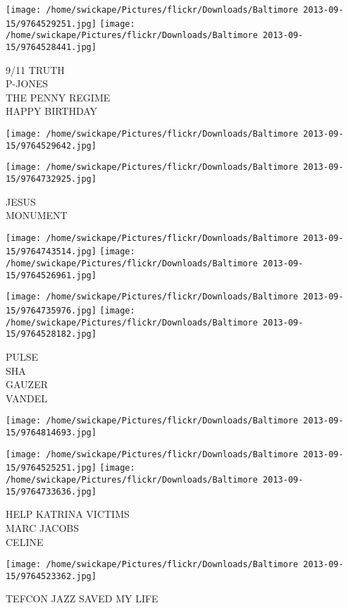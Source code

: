 \documentclass[10pt,letterpaper]{article}
\begin{document}
\texttt{[image: /home/swickape/Pictures/flickr/Downloads/Baltimore 2013-09-15/9764529251.jpg]}
\texttt{[image: /home/swickape/Pictures/flickr/Downloads/Baltimore 2013-09-15/9764528441.jpg]}

9/11 TRUTH\\
P{-}JONES\\
THE PENNY REGIME\\
HAPPY BIRTHDAY
\pagebreak

\texttt{[image: /home/swickape/Pictures/flickr/Downloads/Baltimore 2013-09-15/9764529642.jpg]}

\vspace{0.25in}
\texttt{[image: /home/swickape/Pictures/flickr/Downloads/Baltimore 2013-09-15/9764732925.jpg]}

JESUS\\
MONUMENT
\pagebreak

\texttt{[image: /home/swickape/Pictures/flickr/Downloads/Baltimore 2013-09-15/9764743514.jpg]}
\texttt{[image: /home/swickape/Pictures/flickr/Downloads/Baltimore 2013-09-15/9764526961.jpg]}

\texttt{[image: /home/swickape/Pictures/flickr/Downloads/Baltimore 2013-09-15/9764735976.jpg]}
\texttt{[image: /home/swickape/Pictures/flickr/Downloads/Baltimore 2013-09-15/9764528182.jpg]}

PULSE\\
SHA\\
GAUZER\\
VANDEL
\pagebreak

\texttt{[image: /home/swickape/Pictures/flickr/Downloads/Baltimore 2013-09-15/9764814693.jpg]}

\vspace{0.25in}
\texttt{[image: /home/swickape/Pictures/flickr/Downloads/Baltimore 2013-09-15/9764525251.jpg]}
\texttt{[image: /home/swickape/Pictures/flickr/Downloads/Baltimore 2013-09-15/9764733636.jpg]}

HELP KATRINA VICTIMS\\
MARC JACOBS\\
CELINE
\pagebreak

\texttt{[image: /home/swickape/Pictures/flickr/Downloads/Baltimore 2013-09-15/9764523362.jpg]}

TEFCON JAZZ SAVED MY LIFE
\pagebreak
\end{document}
